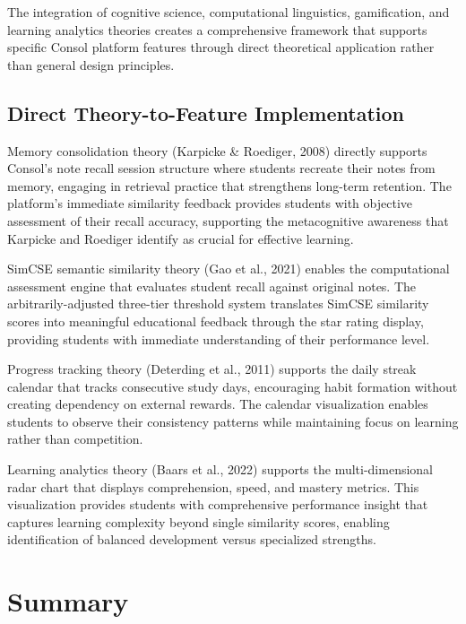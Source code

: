 {\color{maroon}
The integration of cognitive science, computational linguistics, gamification, and learning analytics theories creates a comprehensive framework that supports specific Consol platform features through direct theoretical application rather than general design principles.


\FloatBarrier

\subsection{Direct Theory-to-Feature Implementation}

Memory consolidation theory (Karpicke \& Roediger, 2008) directly supports Consol's note recall session structure where students recreate their notes from memory, engaging in retrieval practice that strengthens long-term retention. The platform's immediate similarity feedback provides students with objective assessment of their recall accuracy, supporting the metacognitive awareness that Karpicke and Roediger identify as crucial for effective learning.

SimCSE semantic similarity theory (Gao et al., 2021) enables the computational assessment engine that evaluates student recall against original notes. The arbitrarily-adjusted three-tier threshold system translates SimCSE similarity scores into meaningful educational feedback through the star rating display, providing students with immediate understanding of their performance level.

Progress tracking theory (Deterding et al., 2011) supports the daily streak calendar that tracks consecutive study days, encouraging habit formation without creating dependency on external rewards. The calendar visualization enables students to observe their consistency patterns while maintaining focus on learning rather than competition.

Learning analytics theory (Baars et al., 2022) supports the multi-dimensional radar chart that displays comprehension, speed, and mastery metrics. This visualization provides students with comprehensive performance insight that captures learning complexity beyond single similarity scores, enabling identification of balanced development versus specialized strengths.
}





\section{Summary}

